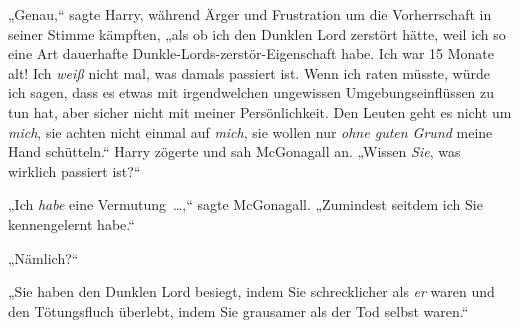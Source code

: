 „Genau,“ sagte Harry, während Ärger und Frustration um die Vorherrschaft in seiner Stimme kämpften, „als ob ich den Dunklen Lord zerstört hätte, weil ich so eine Art dauerhafte Dunkle-Lords-zerstör-Eigenschaft habe. Ich war 15 Monate alt! Ich \emph{weiß} nicht mal, was damals passiert ist. Wenn ich raten müsste, würde ich sagen, dass es etwas mit irgendwelchen ungewissen Umgebungseinflüssen zu tun hat, aber sicher nicht mit meiner Persönlichkeit. Den Leuten geht es nicht um \emph{mich}, sie achten nicht einmal auf \emph{mich}, sie wollen nur \emph{ohne guten Grund} meine Hand schütteln.“ Harry zögerte und sah McGonagall an. „Wissen \emph{Sie}, was wirklich passiert ist?“

„Ich \emph{habe} eine Vermutung …,“ sagte McGonagall. „Zumindest seitdem ich Sie kennengelernt habe.“

„Nämlich?“

„Sie haben den Dunklen Lord besiegt, indem Sie schrecklicher als \emph{er} waren und den Tötungsfluch überlebt, indem Sie grausamer als der Tod selbst waren.“

